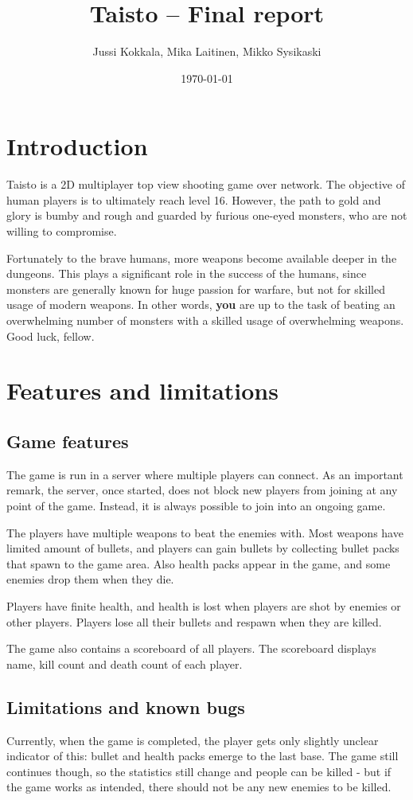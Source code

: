 \documentclass[a4paper,12pt,titlepage]{article}
\title{Taisto -- Final report}
\author{Jussi Kokkala, Mika Laitinen, Mikko Sysikaski}
\date{\today}
\begin{document}
\maketitle

\section{Introduction}
Taisto is a 2D multiplayer top view shooting game over network. The objective of human players is to ultimately reach level 16. However, the path to gold and glory is bumby and rough and guarded by furious one-eyed monsters, who are not willing to compromise. 

Fortunately to the brave humans, more weapons become available deeper in the dungeons. This plays a significant role in the success of the humans, since monsters are generally known for huge passion for warfare, but not for skilled usage of modern weapons. In other words, \textbf{you} are up to the task of beating an overwhelming number of monsters with a skilled usage of overwhelming weapons. Good luck, fellow.

\section{Features and limitations}

\subsection{Game features}

The game is run in a server where multiple players can connect.
As an important remark, the server, once started, does not block new players from
joining at any point of the game. Instead, it is always possible to join into
an ongoing game.

The players have multiple weapons to beat the enemies with. Most weapons have limited amount of bullets, and players can gain bullets by collecting bullet packs that spawn to the game area. Also health packs appear in the game, and some enemies drop them when they die.

Players have finite health, and health is lost when players are shot by enemies or other players. Players lose all their bullets and respawn when they are killed.

The game also contains a scoreboard of all players. The scoreboard displays name, kill count and death count of each player.

\subsection {Limitations and known bugs}
Currently, when the game is completed, the player gets only slightly unclear indicator
of this: bullet and health packs emerge to the last base. The game still
continues though, so the statistics still change and people can be killed - but
if the game works as intended, there should not be any new enemies to be killed.
\end{document}
